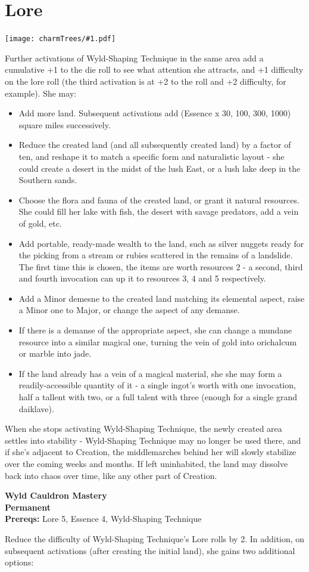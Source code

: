 \documentclass[oneside]{book}
\newcommand{\permanentCharm}[2]{
  \parbox{\linewidth}{
    \par \textbf{\color{MidnightBlue}#1} \\
    \textbf {Permanent} \\
    \textbf {Prereqs:} #2
  }
  \par
}
\newenvironment{Ability}[1]{%
  \section{#1}%
  \vspace{-0.25in}\texttt{[image: charmTrees/\#1.pdf]}%
  \begin{multicols}{2}
}
{
  \end{multicols}
}
\begin{document}
\begin{Ability}{Lore}
  Further activations of Wyld-Shaping Technique in the same area add a cumulative +1 to the die roll to see what attention she attracts, and +1 difficulty on the lore roll (the third activation is at +2 to the roll and +2 difficulty, for example). She may:

  \begin{itemize}
    \item Add more land. Subsequent activations add (Essence x 30, 100, 300, 1000) square miles successively.
    \item Reduce the created land (and all subsequently created land) by a factor of ten, and reshape it to match a specific form and naturalistic layout - she could create a desert in the midst of the lush East, or a lush lake deep in the Southern sands.
    \item Choose the flora and fauna of the created land, or grant it natural resources. She could fill her lake with fish, the desert with savage predators, add a vein of gold, etc.
    \item Add portable, ready-made wealth to the land, such as silver nuggets ready for the picking from a stream or rubies scattered in the remains of a landslide. The first time this is chosen, the items are worth resources 2 - a second, third and fourth invocation can up it to resources 3, 4 and 5 respectively.
    \item Add a Minor demesne to the created land matching its elemental aspect, raise a Minor one to Major, or change the aspect of any demanse.
    \item If there is a demanse of the appropriate aspect, she can change a mundane resource into a similar magical one, turning the vein of gold into orichalcum or marble into jade.
    \item If the land already has a vein of a magical material, she she may form a readily-accessible quantity of it - a single ingot's worth with one invocation, half a tallent with two, or a full talent with three (enough for a single grand daiklave).
  \end{itemize}

  When she stops activating Wyld-Shaping Technique, the newly created area settles into stability - Wyld-Shaping Technique may no longer be used there, and if she's adjacent to Creation, the middlemarches behind her will slowly stabilize over the coming weeks and months. If left uninhabited, the land may dissolve back into chaos over time, like any other part of Creation.

  \permanentCharm{Wyld Cauldron Mastery}
  {Lore 5, Essence 4, Wyld-Shaping Technique}
  Reduce the difficulty of Wyld-Shaping Technique's Lore rolls by 2. In addition, on subsequent activations (after creating the initial land), she gains two additional options:


\end{Ability}
\end{document}
